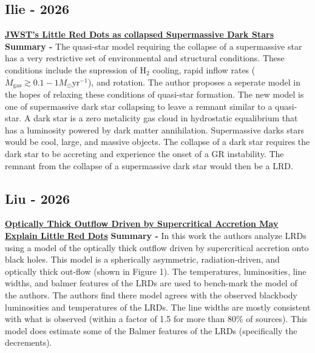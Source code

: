 \documentclass{article}
\begin{document}
\subsection*{Ilie - 2026}
\href{https://ui.adsabs.harvard.edu/abs/2026arXiv260602539I}{\textbf{JWST's Little Red Dots as collapsed Supermassive Dark Stars}}
\newline \textbf{Summary -} The quasi-star model requiring the collapse of a supermassive star has a very restrictive set of environmental and structural conditions. These conditions include the supression of $\text{H}_2$ cooling, rapid inflow rates ($\dot{M}_{\text{gas}} \gtrsim 0.1-1 M_{\odot} \text{yr}^{-1}$), and rotation. The author proposes a seperate model in the hopes of relaxing these conditions of quasi-star formation. The new model is one of supermassive dark star collapsing to leave a remnant similar to a quasi-star. A dark star is a zero metalicity gas cloud in hydrostatic equalibrium that has a luminosity powered by dark matter annihilation. Supermassive darks stars would be cool, large, and massive objects. The collapse of a dark star requires the dark star to be accreting and experience the onset of a GR instability. The remnant from the collapse of a supermassive dark star would then be a LRD.

\subsection*{Liu - 2026}
\href{https://ui.adsabs.harvard.edu/abs/2026arXiv260717448L}{\textbf{Optically Thick Outflow Driven by Supercritical Accretion May Explain Little Red Dots}}
\newline \textbf{Summary -} In this work the authors analyze LRDs using a model of the optically thick outflow driven by supercritical accretion onto black holes. This model is a spherically asymmetric, radiation-driven, and optically thick out-flow (shown in Figure 1). The temperatures, luminosities, line widths, and balmer features of the LRDs are used to bench-mark the model of the authors. The authors find there model agrees with the observed blackbody luminosities and temperatures of the LRDs. The line widths are mostly consistent with what is observed (within a factor of 1.5 for more than 80\% of sources). This model does estimate some of the Balmer features of the LRDs (specifically the decrements). 
\end{document}
